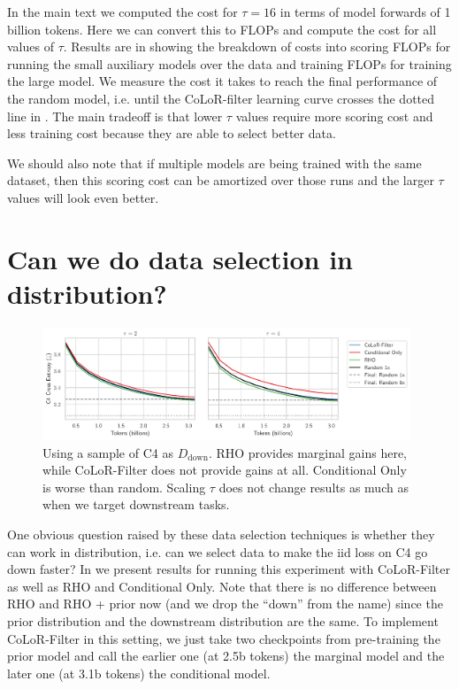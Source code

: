 \documentclass{article}
\newcommand{\Ddown}{D_{\text{down}}}
\begin{document}
In the main text we computed the cost for $ \tau = 16$ in terms of model forwards of 1 billion tokens. Here we can convert this to FLOPs and compute the cost for all values of $ \tau$. Results are in  showing the breakdown of costs into scoring FLOPs for running the small auxiliary models over the data and training FLOPs for training the large model. We measure the cost it takes to reach the final performance of the random model, i.e. until the CoLoR-filter learning curve crosses the dotted line in . The main tradeoff is that lower $ \tau$ values require more scoring cost and less training cost because they are able to select better data.

We should also note that if multiple models are being trained with the same dataset, then this scoring cost can be amortized over those runs and the larger $ \tau$ values will look even better.



\section{Can we do data selection in distribution?}\label{app:id}

\begin{figure}[h]
    \centering
    \includegraphics[width=0.98\textwidth]{images/id_lcs.pdf}
    \caption{Using a sample of C4 as $ \Ddown$. RHO provides marginal gains here, while CoLoR-Filter does not provide gains at all. Conditional Only is worse than random. Scaling $ \tau$ does not change results as much as when we target downstream tasks.}
    \label{fig:in_dist}
\end{figure}

One obvious question raised by these data selection techniques is whether they can work in distribution, i.e. can we select data to make the iid loss on C4 go down faster? In  we present results for running this experiment with CoLoR-Filter as well as RHO and Conditional Only. Note that there is no difference between RHO and RHO + prior now (and we drop the ``down'' from the name) since the prior distribution and the downstream distribution are the same. To implement CoLoR-Filter in this setting, we just take two checkpoints from pre-training the prior model and call the earlier one (at 2.5b tokens) the marginal model and the later one (at 3.1b tokens) the conditional model. 
\end{document}
